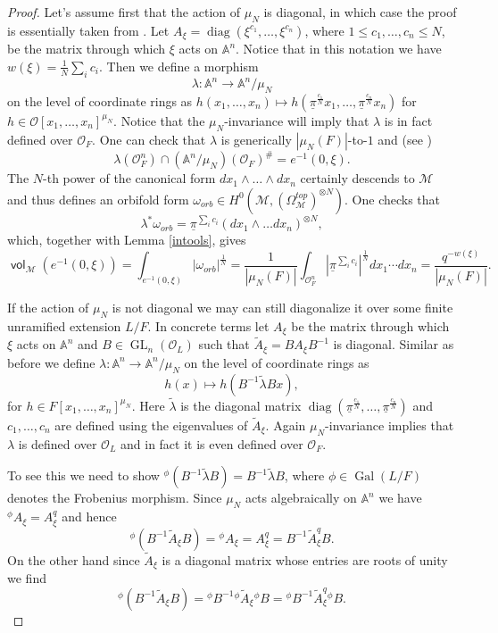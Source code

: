 \documentclass{article}
\DeclareMathOperator{\Gal}{Gal}
\DeclareMathOperator{\GL}{GL}
\newcommand{\Mc}{\mathcal{M}}
\DeclareMathOperator{\vol}{\mathsf{vol}}
\newcommand{\BA}{{\mathbb{A}}}
\newcommand{\CM}{{\mathcal M}}
\newcommand{\CO}{{\mathcal O}}
\DeclareMathOperator{\diag}{diag}
\theoremstyle{definition}
\theoremstyle{plain}
\begin{document}
\begin{proof} Let's assume first that the action of $\mu_N$ is diagonal, in which case the proof is essentially taken from \cite[Section 2]{DL2002}. Let $A_\xi = \diag(\xi^{c_1},\dots,\xi^{c_n})$, where $1 \leq c_1,\dots,c_n \leq N$, be the matrix through which $\xi$ acts on $\BA^n$. Notice that in this notation we have $w(\xi) = \frac{1}{N}\sum_i c_i$. Then we define a morphism
\begin{equation}\label{lambdasur} \lambda: \BA^n \to \BA^n/\mu_N\end{equation}
on the level of coordinate rings as $h(x_1,\dots,x_n) \mapsto h(\underline{\pi}^\frac{c_1}{N}x_1,\dots,\underline{\pi}^\frac{c_n}{N}x_n)$ for $h\in \CO[x_1,\dots,x_n]^{\mu_N}$. Notice that the $\mu_N$-invariance will imply that $\lambda$ is in fact defined over $\CO_F$. One can check that $\lambda$ is generically $|\mu_N(F)|$-to-$1$ and (see \cite[(2.3.4)]{DL2002})
\begin{equation*} \lambda(\CO_F^n) \cap (\BA^n/\mu_N)(\CO_F)^{\#} = e^{-1}(0,\xi).\end{equation*}
The $N$-th power of the canonical form $dx_1\wedge \dots \wedge dx_n$ certainly descends to $\CM$ and thus defines an orbifold form $\omega_{orb} \in H^0(\CM,(\Omega^{top}_\CM)^{\otimes N})$. One checks that
\[ \lambda^* \omega_{orb} = \underline{\pi}^{\sum_i c_i} (dx_1\wedge \dots dx_n)^{\otimes N},\]
which, together with Lemma \ref{intools}, gives
\[\vol_{\Mc}(e^{-1}(0,\xi)) = \int_{e^{-1}(0,\xi)} |\omega_{orb}|^{\frac{1}{N}} = \frac{1}{|\mu_N(F)|}\int_{\CO_F^n} |\underline{\pi}^{\sum_i c_i}|^{\frac{1}{N}}dx_1\cdots dx_n = \frac{q^{-w(\xi)}}{|\mu_N(F)|}.\]

If the action of $\mu_N$ is not diagonal we may can still diagonalize it over some finite unramified extension $L/F$. In concrete terms let $A_\xi$ be the matrix through which $\xi$ acts on $\BA^n$ and $B \in \GL_n(\CO_L)$ such that $\widetilde{A}_\xi = B A_\xi B^{-1} $ is diagonal. Similar as before we define $\lambda: \BA^n \to \BA^n/\mu_N$ on the level of coordinate rings as
\[  h(x)  \mapsto h(B^{-1} \tilde{\lambda} B x), \]
for $h \in F[x_1,\dots,x_n]^{\mu_N}$. Here $\tilde{\lambda}$ is the diagonal matrix $\diag(\underline{\pi}^\frac{c_1}{N},\dots,\underline{\pi}^\frac{c_n}{N})$ and $c_1,\dots,c_n$ are defined using the eigenvalues of $\widetilde{A}_\xi$. Again $\mu_N$-invariance implies that $\lambda$ is defined over $\CO_L$ and in fact it is even defined over $\CO_	F$. 

To see this we need to show ${}^\phi (B^{-1} \tilde{\lambda} B) = B^{-1} \tilde{\lambda} B$, where $\phi \in \Gal(L/F)$ denotes the Frobenius morphism. Since $\mu_N$ acts algebraically on $\BA^n$ we have $ {}^\phi A_\xi = A^q_\xi$ and hence 
\[ ^\phi\left(B^{-1}\widetilde{A}_\xi B \right) = {}^\phi A_\xi = A^q_\xi = B^{-1} \widetilde{A}_\xi^q B.\]
On the other hand since $\widetilde{A}_\xi$ is a diagonal matrix whose entries are roots of unity we find
\[{}^\phi\left(B^{-1}\widetilde{A}_\xi B \right) = {}^\phi B^{-1} {}^\phi {\widetilde{A}_\xi} {}^\phi B = {}^\phi B^{-1} \widetilde{A}_\xi^q {}^\phi B.   \]



\end{proof}
\end{document}
